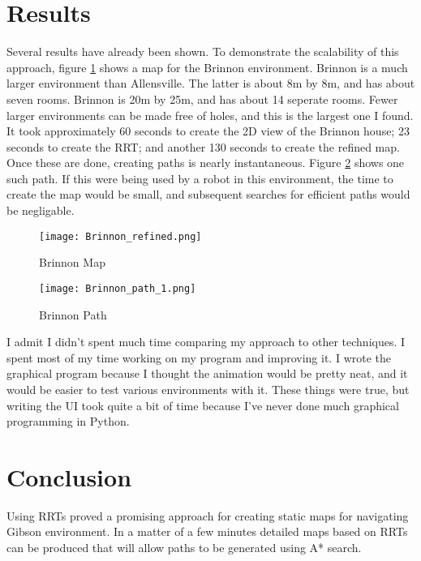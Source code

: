 \documentclass[10pt,twocolumn,letterpaper]{article}
\begin{document}
\section{Results}

Several results have already been shown. To demonstrate the
scalability of this approach, figure \ref{fig:brinnon_map} shows a map
for the Brinnon environment. Brinnon is a much larger environment than
Allensville. The latter is about 8m by 8m, and has about seven
rooms. Brinnon is 20m by 25m, and has about 14 seperate rooms. Fewer
larger environments can be made free of holes, and this is the largest
one I found. It took approximately 60 seconds to create the 2D view of
the Brinnon house; 23 seconds to create the RRT; and another 130
seconds to create the refined map. Once these are done, creating paths
is nearly instantaneous. Figure \ref{fig:brinnon_path_1} shows one
such path. If this were being used by a robot in this environment, the
time to create the map would be small, and subsequent searches for
efficient paths would be negligable.

\begin{centering}
\begin{figure}[ht]
\caption{Brinnon Map} \centering
\texttt{[image: Brinnon\_refined.png]}
\label{fig:brinnon_map}
\end{figure}
\end{centering}

\begin{centering}
\begin{figure}[ht]
\caption{Brinnon Path} \centering
\texttt{[image: Brinnon\_path\_1.png]}
\label{fig:brinnon_path_1}
\end{figure}
\end{centering}

I admit I didn't spent much time comparing my approach to other
techniques. I spent most of my time working on my program and
improving it. I wrote the graphical program because I thought the
animation would be pretty neat, and it would be easier to test various
environments with it. These things were true, but writing the UI took
quite a bit of time because I've never done much graphical programming
in Python. 

\section{Conclusion}

Using RRTs proved a promising approach for creating static maps for
navigating Gibson environment. In a matter of a few minutes detailed
maps based on RRTs can be produced that will allow paths to be
generated using A* search.
\end{document}
